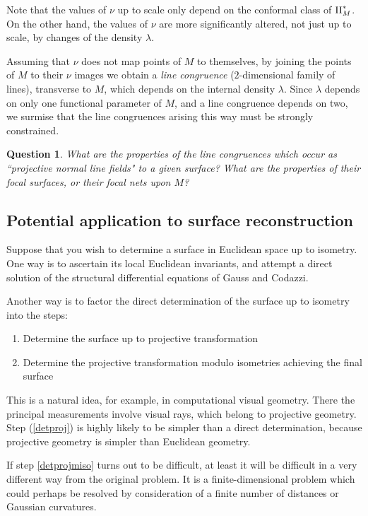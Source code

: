 \documentclass[11pt]{article}
\numberwithin{equation}{section}
\newcounter{count}
\theoremstyle{plain}
\newtheorem{question}[count]{Question}
\theoremstyle{remark}
\newcommand{\II}{\textnormal{II}}
\begin{document}
Note that the values of $\nu$ up to scale only depend on the conformal class of $\II_M^{*}$. On the other hand, the values of $\nu$ are more significantly altered, not just up to scale, by changes of the density $\lambda$.

Assuming that $\nu$ does not map points of $M$ to themselves, by joining the points of $M$ to their $\nu$ images we obtain a \emph{line congruence} ($2$-dimensional family of lines), transverse to $M$, which depends on the internal density $\lambda$. Since $\lambda$ depends on only one functional parameter of $M$, and a line congruence depends on two, we surmise that the line congruences arising this way must be strongly constrained.

\begin{question} What are the properties of the line congruences which occur as ``projective normal line fields" to a given surface? What are the properties of their focal surfaces, or their focal nets upon $M$?
\end{question}

\subsection{Potential application to surface reconstruction}

Suppose that you wish to determine a surface in Euclidean space up to isometry. One way is to ascertain its local Euclidean invariants, and attempt a direct solution of the structural differential equations of Gauss and Codazzi.

Another way is to factor the direct determination of the surface up to isometry into the steps:
\begin{enumerate}
\itemsep0em
\item{\label{detproj}Determine the surface up to projective transformation}
\item{\label{detprojmiso}Determine the projective transformation modulo isometries achieving the final surface}
\end{enumerate}

This is a natural idea, for example, in computational visual geometry. There the principal measurements involve visual rays, which belong to projective geometry. Step (\ref{detproj}) is highly likely to be simpler than a direct determination, because projective geometry is simpler than Euclidean geometry.

If step \ref{detprojmiso} turns out to be difficult, at least it will be difficult in a very different way from the original problem. It is a finite-dimensional problem which could perhaps be resolved by consideration of a finite number of distances or Gaussian curvatures.
\end{document}
